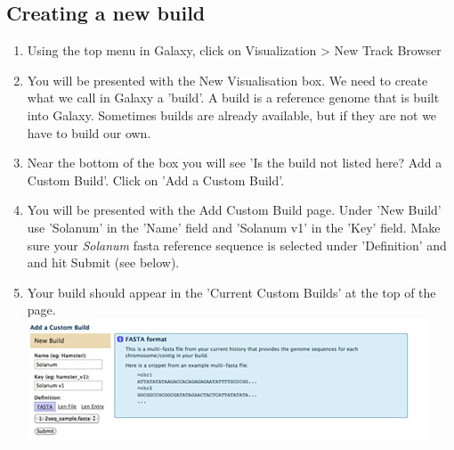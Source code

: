 \documentclass[12pt,a4paper]{article}
\begin{document}
\subsection{Creating a new build}
\begin{enumerate}
	\item Using the top menu in Galaxy, click on Visualization >
          New Track Browser
	\item You will be presented with the New Visualisation box. We
          need to create what we call in Galaxy a 'build'. A build is
          a reference genome that is built into Galaxy. Sometimes
          builds are already available, but if they are not we have to
          build our own.
	\item Near the bottom of the box you will see 'Is the build
          not listed here? Add a Custom Build'. Click on 'Add a Custom
          Build'.
	\item You will be presented with the Add Custom Build
          page. Under 'New Build' use 'Solanum' in the 'Name' field
          and 'Solanum v1' in the 'Key' field. Make sure your
          \emph{Solanum} fasta reference sequence is selected under
          'Definition' and and hit Submit (see below).
	\item Your build should appear in the 'Current Custom Builds'
          at the top of the page.  \\
\includegraphics{images/custombuild.jpg}
\end{enumerate}
\end{document}
